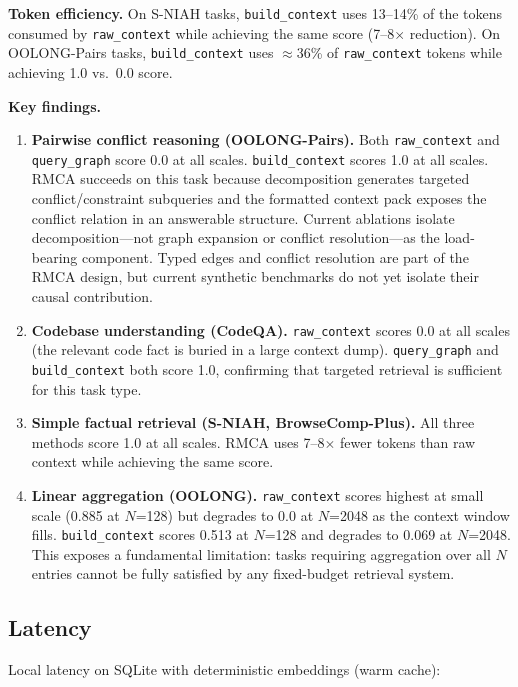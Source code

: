 \documentclass[conference]{IEEEtran}
\begin{document}
\textbf{Token efficiency.} On S-NIAH tasks, \texttt{build\_context} uses 13--14\% of the
tokens consumed by \texttt{raw\_context} while achieving the same score (7--8$\times$
reduction). On OOLONG-Pairs tasks, \texttt{build\_context} uses $\approx$36\% of
\texttt{raw\_context} tokens while achieving 1.0 vs.\ 0.0 score.

\textbf{Key findings.}
\begin{enumerate}
\item \textbf{Pairwise conflict reasoning (OOLONG-Pairs).} Both \texttt{raw\_context} and
\texttt{query\_graph} score 0.0 at all scales. \texttt{build\_context} scores 1.0 at all
scales. RMCA succeeds on this task because decomposition generates targeted conflict/constraint subqueries and the formatted context pack exposes the conflict relation in an answerable structure. Current ablations isolate decomposition---not graph expansion or conflict resolution---as the load-bearing component. Typed edges and conflict resolution are part of the RMCA design, but current synthetic benchmarks do not yet isolate their causal contribution.
\item \textbf{Codebase understanding (CodeQA).} \texttt{raw\_context} scores 0.0 at all
scales (the relevant code fact is buried in a large context dump). \texttt{query\_graph}
and \texttt{build\_context} both score 1.0, confirming that targeted retrieval is sufficient
for this task type.
\item \textbf{Simple factual retrieval (S-NIAH, BrowseComp-Plus).} All three methods score
1.0 at all scales. RMCA uses 7--8$\times$ fewer tokens than raw context while achieving the
same score.
\item \textbf{Linear aggregation (OOLONG).} \texttt{raw\_context} scores highest at small
scale (0.885 at $N$=128) but degrades to 0.0 at $N$=2048 as the context window fills.
\texttt{build\_context} scores 0.513 at $N$=128 and degrades to 0.069 at $N$=2048. This
exposes a fundamental limitation: tasks requiring aggregation over all $N$ entries cannot
be fully satisfied by any fixed-budget retrieval system.
\end{enumerate}

\subsection{Latency}

Local latency on SQLite with deterministic embeddings (warm cache):
\end{document}

